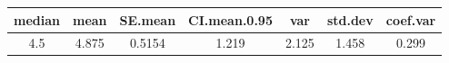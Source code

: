 \documentclass[]{article}
\begin{document}
\begin{longtable}[]{@{}ccccccc@{}}
\toprule
\begin{minipage}[b]{0.10\columnwidth}\centering\strut
median\strut
\end{minipage} & \begin{minipage}[b]{0.09\columnwidth}\centering\strut
mean\strut
\end{minipage} & \begin{minipage}[b]{0.11\columnwidth}\centering\strut
SE.mean\strut
\end{minipage} & \begin{minipage}[b]{0.17\columnwidth}\centering\strut
CI.mean.0.95\strut
\end{minipage} & \begin{minipage}[b]{0.09\columnwidth}\centering\strut
var\strut
\end{minipage} & \begin{minipage}[b]{0.11\columnwidth}\centering\strut
std.dev\strut
\end{minipage} & \begin{minipage}[b]{0.11\columnwidth}\centering\strut
coef.var\strut
\end{minipage}\tabularnewline
\midrule
\endhead
\begin{minipage}[t]{0.10\columnwidth}\centering\strut
4.5\strut
\end{minipage} & \begin{minipage}[t]{0.09\columnwidth}\centering\strut
4.875\strut
\end{minipage} & \begin{minipage}[t]{0.11\columnwidth}\centering\strut
0.5154\strut
\end{minipage} & \begin{minipage}[t]{0.17\columnwidth}\centering\strut
1.219\strut
\end{minipage} & \begin{minipage}[t]{0.09\columnwidth}\centering\strut
2.125\strut
\end{minipage} & \begin{minipage}[t]{0.11\columnwidth}\centering\strut
1.458\strut
\end{minipage} & \begin{minipage}[t]{0.11\columnwidth}\centering\strut
0.299\strut
\end{minipage}\tabularnewline
\bottomrule
\end{longtable}
\end{document}
